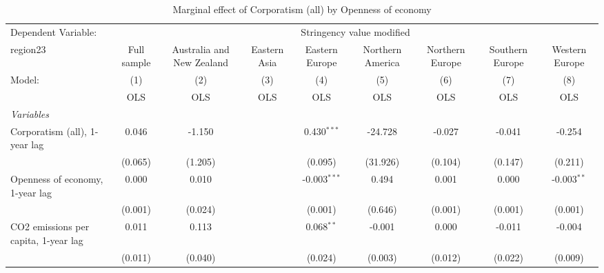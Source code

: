 
\begin{table}[htbp]
   \caption{Marginal effect of Corporatism (all) by Openness of economy}
   \centering
   \begin{tabular}{lcccccccc}
      \toprule
      Dependent Variable: & \multicolumn{8}{c}{Stringency value modified}\\
      region23                                                        & Full sample   & Australia and New Zealand & Eastern Asia & Eastern Europe & Northern America & Northern Europe & Southern Europe & Western Europe \\   
      Model:                                                          & (1)           & (2)                       & (3)          & (4)            & (5)              & (6)             & (7)             & (8)\\  
                                                                      &  OLS          & OLS                       & OLS          & OLS            & OLS              & OLS             & OLS             & OLS\\  
      \midrule
      \emph{Variables}\\
      Corporatism (all), 1-year lag                                   & 0.046         & -1.150                    &              & 0.430$^{***}$  & -24.728          & -0.027          & -0.041          & -0.254\\   
                                                                      & (0.065)       & (1.205)                   &              & (0.095)        & (31.926)         & (0.104)         & (0.147)         & (0.211)\\   
      Openness of economy, 1-year lag                                 & 0.000         & 0.010                     &              & -0.003$^{***}$ & 0.494            & 0.001           & 0.000           & -0.003$^{**}$\\   
                                                                      & (0.001)       & (0.024)                   &              & (0.001)        & (0.646)          & (0.001)         & (0.001)         & (0.001)\\   
      CO2 emissions per capita, 1-year lag                            & 0.011         & 0.113                     &              & 0.068$^{**}$   & -0.001           & 0.000           & -0.011          & -0.004\\   
                                                                      & (0.011)       & (0.040)                   &              & (0.024)        & (0.003)          & (0.012)         & (0.022)         & (0.009)\\   

\end{tabular}
\end{table}
